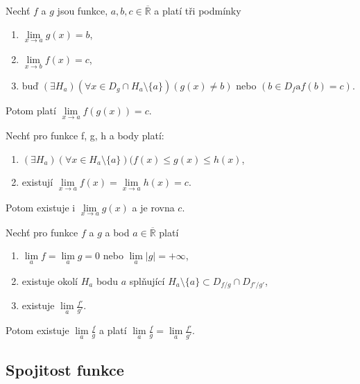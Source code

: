  Nechť $f$ a $g$ jsou funkce, $a, b, c \in \overline{\mathbb{R}}$ a platí tři podmínky
\vspace{-5pt}
\begin{enumerate}
	\item $\lim\limits_{x\rightarrow a}g(x)=b$,
	\item $\lim\limits_{x\rightarrow b}f(x)=c$,
	\item buď $(\exists H_a)(\forall x \in D_g\cap H_a\setminus \{a\})(g(x)\neq b)$ nebo $(b\in D_f \mathrm{a} f(b)=c)$.
\end{enumerate}
\vspace{-5pt}
Potom platí $\lim\limits_{x\rightarrow a} f(g(x))=c$.

 Nechť pro funkce f, g, h a body platí:
\vspace{-5pt}
\begin{enumerate}
	\item $(\exists H_a)(\forall x \in H_a\setminus \{a\})(f(x)\leq g(x) \leq h(x)$,
	\item existují $\lim\limits_{x\rightarrow a}f(x)=\lim\limits_{x\rightarrow a}h(x)=c$.
\end{enumerate}
\vspace{-5pt}
Potom existuje i $\lim\limits_{x\rightarrow a}g(x)$ a je rovna $c$.

 Nechť pro funkce $f$ a $g$ a bod $a \in\overline{\mathbb{R}}$ platí
\vspace{-5pt}
\begin{enumerate}
	\item $\lim\limits_{a}f = \lim\limits_{a}g =0$ nebo $\lim\limits_{a}|g| =+\infty$,
	\item existuje okolí $H_a$ bodu $a$ splňující $ H_a\setminus \{a\}\subset D_{f/g}\cap D_{f'/g'} $,
	\item existuje $\lim\limits_a \frac{f'}{g'}$.
\end{enumerate}
\vspace{-5pt}
Potom existuje $\lim\limits_a\frac{f}{g}$ a platí $\lim\limits_a\frac{f}{g} = \lim\limits_a\frac{f'}{g'}$.

\subsection{Spojitost funkce}

